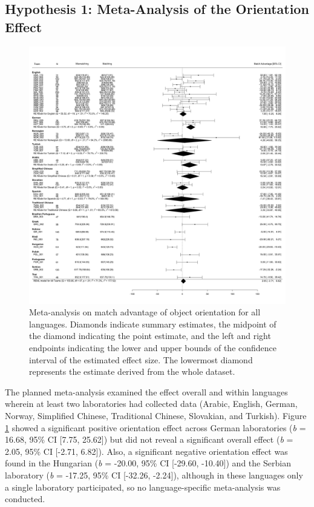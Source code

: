 \documentclass[
  man,mask,floatsintext]{apa7}
\begin{document}
\hypertarget{hypothesis-1-meta-analysis-of-the-orientation-effect}{%
\subsection{Hypothesis 1: Meta-Analysis of the Orientation Effect}\label{hypothesis-1-meta-analysis-of-the-orientation-effect}}

\begin{figure}
\includegraphics[width=1\linewidth,height=0.9\textheight]{includes/fig/meta-all} \caption{Meta-analysis on match advantage of object orientation for all languages. Diamonds indicate summary estimates, the midpoint of the diamond indicating the point estimate, and the left and right endpoints indicating the lower and upper bounds of the confidence interval of the estimated effect size. The lowermost diamond represents the estimate derived from the whole dataset.}\label{fig:meta-all-plot}
\end{figure}

The planned meta-analysis examined the effect overall and within
languages wherein at least two laboratories had collected data (Arabic,
English, German, Norway, Simplified Chinese, Traditional Chinese,
Slovakian, and Turkish). Figure \ref{fig:meta-all-plot} showed a
significant positive orientation effect across German laboratories (\emph{b}
= 16.68, 95\% CI
{[}7.75,
25.62{]}) but did not reveal a
significant overall effect (\emph{b} =
2.05, 95\% CI
{[}-2.71,
6.82{]}). Also, a significant
negative orientation effect was found in the Hungarian (\emph{b} = -20.00,
95\% CI {[}-29.60, -10.40{]}) and the Serbian laboratory (\emph{b} = -17.25, 95\%
CI {[}-32.26, -2.24{]}), although in these languages only a single
laboratory participated, so no language-specific meta-analysis was
conducted.
\end{document}
